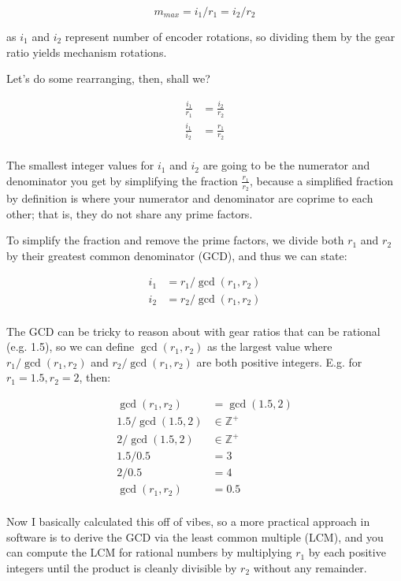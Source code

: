 \documentclass[11pt]{article}
\begin{document}
\[
    m_{max} = i_1 / r_1 = i_2 / r_2
\]

as $i_1$ and $i_2$ represent number of encoder rotations, so dividing them by the gear ratio yields mechanism rotations.

Let's do some rearranging, then, shall we?

\begin{align*}
    \frac{i_1}{r_1} &= \frac{i_2}{r_2}\\
    \frac{i_1}{i_2} &= \frac{r_1}{r_2}\\
\end{align*}

The smallest integer values for $i_1$ and $i_2$ are going to be the numerator and denominator you get by simplifying the fraction $\frac{r_1}{r_2}$, because a simplified fraction by definition is where your numerator and denominator are coprime to each other; that is, they do not share any prime factors.

To simplify the fraction and remove the prime factors, we divide both $r_1$ and $r_2$ by their greatest common denominator (GCD), and thus we can state:

\begin{align*}
    i_1 &= r_1 / \gcd(r_1, r_2)\\
    i_2 &= r_2 / \gcd(r_1, r_2)\\
\end{align*}

The GCD can be tricky to reason about with gear ratios that can be rational (e.g. 1.5), so we can define $\gcd(r_1, r_2)$ as the largest value where $r_1 / \gcd(r_1, r_2)$ and $r_2 / \gcd(r_1, r_2)$ are both positive integers. E.g. for $r_1 = 1.5, r_2 = 2$, then:

\begin{align*}
    \gcd(r_1, r_2) &= \gcd(1.5, 2)\\
    1.5 / \gcd(1.5, 2) &\in \mathbb{Z^+}\\
    2 / \gcd(1.5, 2) &\in \mathbb{Z^+}\\
    1.5 / 0.5 &= 3\\
    2 / 0.5 &= 4\\
    \gcd(r_1, r_2) &= 0.5\\
\end{align*}

Now I basically calculated this off of vibes, so a more practical approach in software is to derive the GCD via the least common multiple (LCM), and you can compute the LCM for rational numbers by multiplying $r_1$ by each positive integers until the product is cleanly divisible by $r_2$ without any remainder. 
\end{document}
